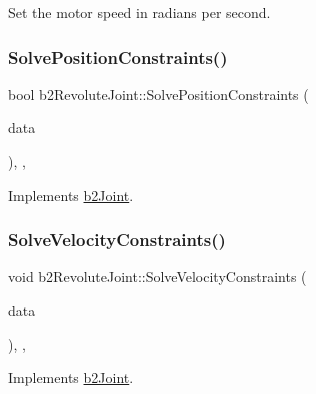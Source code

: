 Set the motor speed in radians per second. 

\mbox{\label{classb2_revolute_joint_a01cab9d9609926a6debcd457bb8068f2}} 
\subsubsection{\texorpdfstring{SolvePositionConstraints()}{SolvePositionConstraints()}}
{\footnotesize\ttfamily bool b2\+Revolute\+Joint\+::\+Solve\+Position\+Constraints (\begin{DoxyParamCaption}\item[{const \mbox{\hyperlink{structb2_solver_data}{b2\+Solver\+Data}} \&}]{data }\end{DoxyParamCaption})\hspace{0.3cm}{\ttfamily [override]}, {\ttfamily [protected]}, {\ttfamily [virtual]}}



Implements \mbox{\hyperlink{classb2_joint_af767ac9aa494bd15cdf83dfe3e487d9c}{b2\+Joint}}.

\mbox{\label{classb2_revolute_joint_a8eee8e87c79588ff041f1382b7fcbcd4}} 
\subsubsection{\texorpdfstring{SolveVelocityConstraints()}{SolveVelocityConstraints()}}
{\footnotesize\ttfamily void b2\+Revolute\+Joint\+::\+Solve\+Velocity\+Constraints (\begin{DoxyParamCaption}\item[{const \mbox{\hyperlink{structb2_solver_data}{b2\+Solver\+Data}} \&}]{data }\end{DoxyParamCaption})\hspace{0.3cm}{\ttfamily [override]}, {\ttfamily [protected]}, {\ttfamily [virtual]}}



Implements \mbox{\hyperlink{classb2_joint_ad302c8d02efcfe934158de0dc429348d}{b2\+Joint}}.




